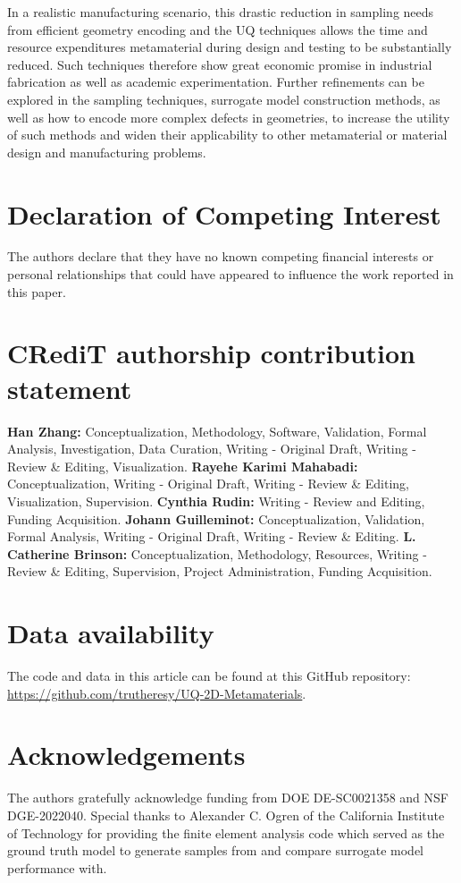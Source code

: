\documentclass[preprint,review,12pt]{elsarticle}
\begin{document}
In a realistic manufacturing scenario, this drastic reduction in sampling needs from efficient geometry encoding and the UQ techniques allows the time and resource expenditures metamaterial during design and testing to be substantially reduced. Such techniques therefore show great economic promise in industrial fabrication as well as academic experimentation. Further refinements can be explored in the sampling techniques, surrogate model construction methods, as well as how to encode more complex defects in geometries, to increase the utility of such methods and widen their applicability to other metamaterial or material design and manufacturing problems.

\section*{Declaration of Competing Interest}
The authors declare that they have no known competing financial interests or personal relationships that could have appeared to influence the work reported in this paper.

\section*{CRediT authorship contribution statement}
\textbf{Han Zhang:} Conceptualization, Methodology, Software, Validation, Formal Analysis, Investigation, Data Curation, Writing - Original Draft, Writing - Review \& Editing, Visualization. \textbf{Rayehe Karimi Mahabadi:} Conceptualization, Writing - Original Draft, Writing - Review \& Editing, Visualization, Supervision. \textbf{Cynthia Rudin:} Writing - Review and Editing, Funding Acquisition. \textbf{Johann Guilleminot:} Conceptualization, Validation, Formal Analysis, Writing - Original Draft, Writing - Review \& Editing. \textbf{L. Catherine Brinson:} Conceptualization, Methodology, Resources, Writing - Review \& Editing, Supervision, Project Administration, Funding Acquisition.

\section*{Data availability}
The code and data in this article
can be found at this GitHub repository:
\url{https://github.com/trutheresy/UQ-2D-Metamaterials}.

\section*{Acknowledgements}
The authors gratefully acknowledge funding from DOE DE-SC0021358 and NSF DGE-2022040. Special thanks to Alexander C. Ogren of the California Institute of Technology for providing the finite element analysis code which served as the ground truth model to generate samples from and compare surrogate model performance with. 
\end{document}
